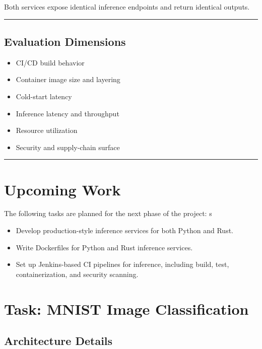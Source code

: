 \documentclass{ieeeaccess}
\begin{document}
Both services expose identical inference endpoints and return identical outputs.

\hrule

\subsection{Evaluation Dimensions}

\begin{itemize}
    \item CI/CD build behavior
    \item Container image size and layering
    \item Cold-start latency
    \item Inference latency and throughput
    \item Resource utilization
    \item Security and supply-chain surface
\end{itemize}

\hrule

\section{Upcoming Work}

The following tasks are planned for the next phase of the project:
s
\begin{itemize}
    \item Develop production-style inference services for both Python and Rust.
    \item Write Dockerfiles for Python and Rust inference services.
    \item Set up Jenkins-based CI pipelines for inference, including build, test, containerization, and security scanning.
\end{itemize}

\clearpage

\section{Task: MNIST Image Classification}
\subsection{Architecture Details}
\end{document}
